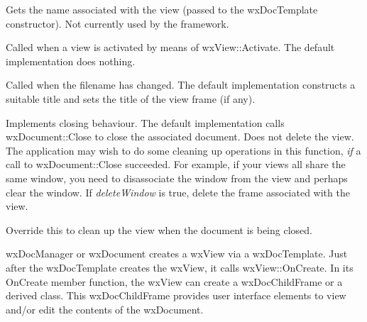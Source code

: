 \label{wxviewgetviewname}


Gets the name associated with the view (passed to the wxDocTemplate constructor).
Not currently used by the framework.

\label{wxviewonactivateview}


Called when a view is activated by means of wxView::Activate. The default implementation does
nothing.

\label{wxviewonchangefilename}


Called when the filename has changed. The default implementation constructs a
suitable title and sets the title of the view frame (if any).

\label{wxviewonclose}


Implements closing behaviour. The default implementation calls wxDocument::Close
to close the associated document. Does not delete the view. The application
may wish to do some cleaning up operations in this function, {\it if} a
call to wxDocument::Close succeeded. For example, if your views
all share the same window, you need to disassociate the window from the view
and perhaps clear the window. If {\it deleteWindow} is true, delete the
frame associated with the view.

\label{wxviewonclosingdocument}


Override this to clean up the view when the document is being
closed.

\label{wxviewoncreate}


wxDocManager or wxDocument creates a wxView via a wxDocTemplate.
Just after the wxDocTemplate creates the wxView, it calls
wxView::OnCreate. In its OnCreate member function, the wxView can create a wxDocChildFrame
or a derived class. This wxDocChildFrame provides user interface
elements to view and/or edit the contents of the wxDocument.

